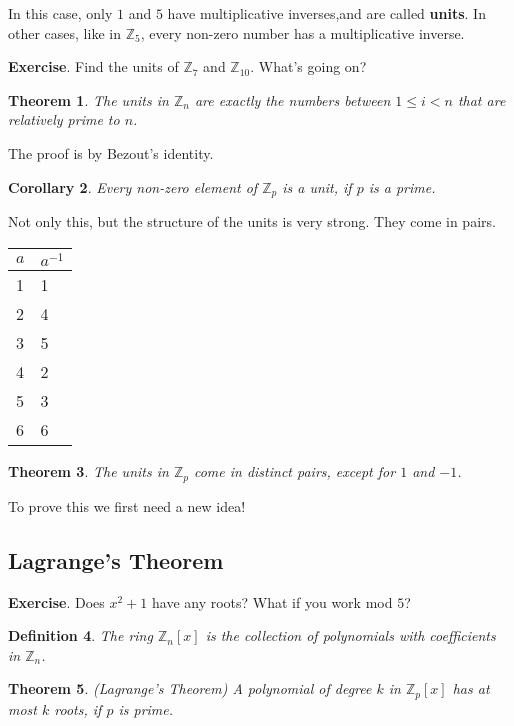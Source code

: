 \documentclass[11pt]{article}
\newtheorem{thm}{Theorem}
\newtheorem{dfn}[thm]{Definition}
\newtheorem{cor}[thm]{Corollary}
\theoremstyle{definition}
\numberwithin{thm}{section}
\begin{document}
In this case, only $1$ and $5$ have multiplicative inverses,and are called \textbf{units}. In other cases, like in $\mathbb{Z}_5$, every non-zero number has a multiplicative inverse.

\textbf{Exercise}. Find the units of $\mathbb{Z}_7$ and $\mathbb{Z}_{10}$. What's going on?

\begin{thm} The units in $\mathbb{Z}_n$ are exactly the numbers between $1 \leq i < n$ that are relatively prime to $n$.
\end{thm}

The proof is by Bezout's identity.

\begin{cor} Every non-zero element of $\mathbb{Z}_p$ is a unit, if $p$ is a prime.
\end{cor}

Not only this, but the structure of the units is very strong. They come in pairs.

\begin{table}[!ht]
\begin{tabular}{l|l}
$a$ & $a^{-1}$ \\ \hline
1   & 1        \\
2   & 4        \\
3   & 5        \\
4   & 2        \\
5   & 3        \\
6   & 6       
\end{tabular}
\end{table}

\begin{thm} The units in $\mathbb{Z}_p$ come in distinct pairs, except for $1$ and $-1$.
\end{thm}

To prove this we first need a new idea!

\subsection{Lagrange's Theorem}

\textbf{Exercise}. Does $x^2 + 1$ have any roots? What if you work mod $5$?

\begin{dfn} The ring $\mathbb{Z}_n [x]$ is the collection of polynomials with coefficients in $\mathbb{Z}_n$.
\end{dfn}

\begin{thm} (Lagrange's Theorem) A polynomial of degree $k$ in $\mathbb{Z}_p [x]$ has at most $k$ roots, if $p$ is prime.
\end{thm}
\end{document}
